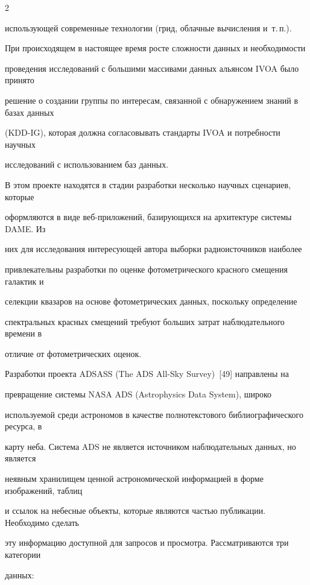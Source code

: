 \begin{multicols}{2}
\begin{itemize}
использующей современные технологии (грид, облачные вычисления и~т.\,п.). 

\end{itemize}



При происходящем в настоящее время росте сложности данных и необходимости 

проведения исследований с большими массивами данных альянсом IVOA было принято 

решение о создании группы по интересам, связанной с обнаружением знаний в базах данных 

(KDD-IG), которая должна согласовывать стандарты IVOA и потребности научных 

исследований с использованием баз данных.

      

      В этом проекте находятся в стадии разработки несколько научных сценариев, которые 

оформляются в виде веб-при\-ло\-же\-ний, базирующихся на архитектуре системы DAME. Из 

них для исследования интересующей автора выборки радиоисточников наиболее 

привлекательны разработки по оценке фотометрического красного смещения галактик и 

селекции квазаров на основе фотометрических данных, поскольку определение 

спектральных красных смещений требуют больших затрат наблюдательного времени в 

отличие от фотометрических оценок.

      

      Разработки проекта ADSASS ({The ADS All-Sky Survey})~[49] направлены на 

превращение системы NASA ADS ({Astrophysics Data System}), широко 

используемой среди астрономов в качестве полнотекстового библиографического ресурса, в 

карту неба. Система ADS не является источником наблю\-да\-тель\-ных данных, но является 

неявным хранилищем ценной астрономической информацией в форме изображений, таблиц 

и ссылок на небесные объекты, которые являются частью публикации. Необходимо сделать 

эту информацию доступной для запросов и просмотра. Рассматриваются три категории 

данных: 


\end{multicols}
